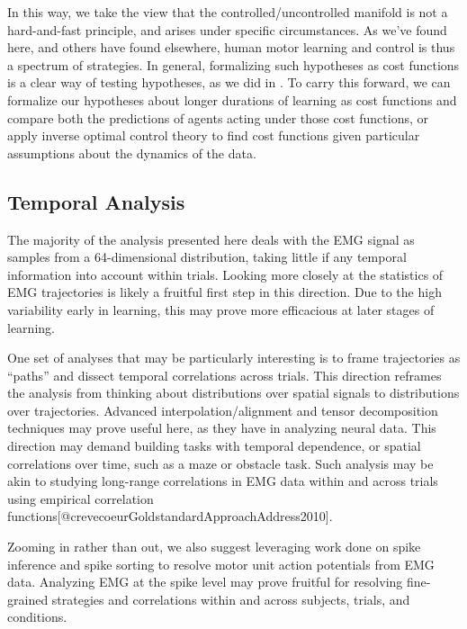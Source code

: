 \documentclass[../main.tex]{subfiles}
\begin{document}
In this way, we take the view that the controlled/uncontrolled manifold is not a hard-and-fast principle, and arises under specific circumstances. As we've found here, and others have found elsewhere, human motor learning and control is thus a spectrum of strategies\cite{raczSpatiotemporalAnalysisReveals2013}. In general, formalizing such hypotheses as cost functions is a clear way of testing hypotheses, as we did in . To carry this forward, we can formalize our hypotheses about longer durations of learning as cost functions and compare both the predictions of agents acting under those cost functions, or apply inverse optimal control theory to find cost functions given particular assumptions about the dynamics of the data.







\subsection{Temporal Analysis}

The majority of the analysis presented here deals with the EMG signal as samples from a 64-dimensional distribution, taking little if any temporal information into account within trials. Looking more closely at the statistics of EMG trajectories is likely a fruitful first step in this direction. Due to the high variability early in learning, this may prove more efficacious at later stages of learning.

One set of analyses that may be particularly interesting is to frame trajectories as ``paths'' and dissect temporal correlations across trials. This direction reframes the analysis from thinking about distributions over spatial signals to distributions over trajectories\cite{mcnameeHierarchicalModelbasedPolicy2020b,mcnameeCharacterizingOptimalHierarchical2017a}. Advanced interpolation/alignment and tensor decomposition techniques may prove useful here, as they have in analyzing neural data\cite{onkenUsingMatrixTensor2016}. This direction may demand building tasks with temporal dependence, or spatial correlations over time, such as a maze or obstacle task. Such analysis may be akin to studying long-range correlations in EMG data within and across trials using empirical correlation functions[@crevecoeurGoldstandardApproachAddress2010].

Zooming in rather than out, we also suggest leveraging work done on spike inference and spike sorting to resolve motor unit action potentials from EMG data\cite{pachitariuSpikeSortingKilosort42024}. Analyzing EMG at the spike level may prove fruitful for resolving fine-grained strategies and correlations within and across subjects, trials, and conditions\cite{digeUnsupervisedBayesianDecomposition2010,mendezguerraNoninvasiveRealtimeAccess2021}.
\end{document}
